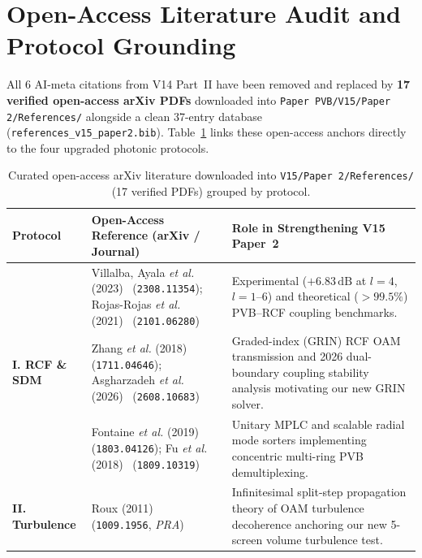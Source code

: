 \documentclass[10pt,letterpaper]{article}
\begin{document}
\vspace{4pt}

\section{Open-Access Literature Audit and Protocol Grounding}
\label{sec:p2_lit}

All 6 AI-meta citations from V14 Part~II have been removed and replaced by \textbf{17 verified open-access arXiv PDFs} downloaded into \texttt{Paper PVB/V15/Paper 2/References/} alongside a clean 37-entry database (\texttt{references\_v15\_paper2.bib}). Table~\ref{tab:p2_refs} links these open-access anchors directly to the four upgraded photonic protocols.

\begin{table}[t]
\centering
\caption{Curated open-access arXiv literature downloaded into \texttt{V15/Paper 2/References/} (17 verified PDFs) grouped by protocol.}
\label{tab:p2_refs}
\scriptsize
\renewcommand{\arraystretch}{1.15}
\begin{tabularx}{\linewidth}{@{}l>{\raggedright\arraybackslash}p{4.6cm}>{\raggedright\arraybackslash}X@{}}
\toprule
\textbf{Protocol} & \textbf{Open-Access Reference (arXiv / Journal)} & \textbf{Role in Strengthening V15 Paper~2} \\
\midrule
\multirow{3}{*}{\textbf{I. RCF \& SDM}}
  & Villalba, Ayala \emph{et al.} (2023)~\cite{Villalba2023} (\texttt{2308.11354}); Rojas-Rojas \emph{et al.} (2021)~\cite{RojasRojas2021} (\texttt{2101.06280}) & Experimental ($+6.83\,\mathrm{dB}$ at $l=4$, $l=1\text{--}6$) and theoretical ($>99.5\%$) PVB--RCF coupling benchmarks. \\
  & Zhang \emph{et al.} (2018)~\cite{Zhang2018GRIN} (\texttt{1711.04646}); Asgharzadeh \emph{et al.} (2026)~\cite{Asgharzadeh2026} (\texttt{2608.10683}) & Graded-index (GRIN) RCF OAM transmission and 2026 dual-boundary coupling stability analysis motivating our new GRIN solver. \\
  & Fontaine \emph{et al.} (2019)~\cite{Fontaine2019} (\texttt{1803.04126}); Fu \emph{et al.} (2018)~\cite{Fu2018} (\texttt{1809.10319}) & Unitary MPLC and scalable radial mode sorters implementing concentric multi-ring PVB demultiplexing. \\
\midrule
\multirow{2}{*}{\textbf{II. Turbulence}}
  & Roux (2011)~\cite{Roux2011} (\texttt{1009.1956}, \emph{PRA}) & Infinitesimal split-step propagation theory of OAM turbulence decoherence anchoring our new 5-screen volume turbulence test. \\

\end{tabularx}
\end{table}
\end{document}
